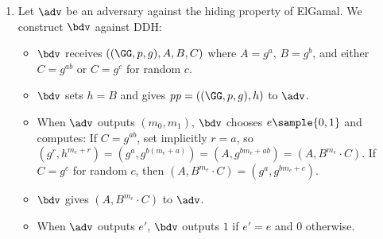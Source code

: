 \begin{enumerate}
  \item Let $\adv$ be an adversary against the hiding property of ElGamal.
        We construct $\bdv$ against DDH:
        \begin{itemize}
          \item $\bdv$ receives $(\gparam, A, B, C)$ where $A = g^a$, $B = g^b$, and either $C = g^{ab}$ or $C = g^c$ for random $c$.
          \item $\bdv$ sets $h = B$ and gives $\params = (\gparam, h)$ to $\adv$.
          \item When $\adv$ outputs $(m_0, m_1)$, $\bdv$ chooses $e \sample \{0, 1\}$ and computes:
                If $C = g^{ab}$, set implicitly $r = a$, so $(g^r, h^{m_e + r}) = (g^a, g^{b(m_e + a)}) = (A, g^{bm_e + ab}) = (A, B^{m_e} \cdot C)$.
                If $C = g^c$ for random $c$, then $(A, B^{m_e} \cdot C) = (g^a, g^{bm_e + c})$.
          \item $\bdv$ gives $(A, B^{m_e} \cdot C)$ to $\adv$.
          \item When $\adv$ outputs $e'$, $\bdv$ outputs $1$ if $e' = e$ and $0$ otherwise.
        \end{itemize}


\end{enumerate}
